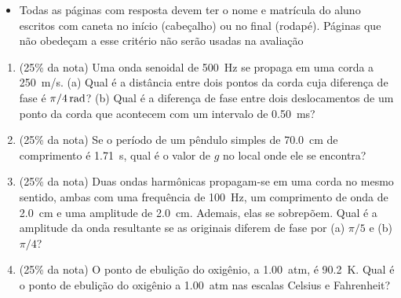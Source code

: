 \documentclass[12pt,a4paper,brazilian, fleqn]{article}
\newcommand{\ratio}[1]{(#1\% da nota)}
\begin{document}
\begin{tcolorbox}[colback=black!10, colframe=black!50, title=Observações]
    \begin{itemize}
        \item Todas as páginas com resposta devem ter o nome e matrícula do
            aluno escritos com caneta no início (cabeçalho) ou no final
            (rodapé). Páginas que não obedeçam a esse critério não serão usadas
            na avaliação
    \end{itemize}
\end{tcolorbox}

\vspace{2em}

\begin{enumerate}

    \item \ratio{25} Uma onda senoidal de \SI{500}{Hz} se propaga em uma corda
        a \SI{250}{m/s}. (a) Qual é a distância entre dois pontos da corda cuja
        diferença de fase é \(\SI[parse-numbers=false]{\pi/4}{rad}\)? (b) Qual
        é a diferença de fase entre dois deslocamentos de um ponto da corda que
        acontecem com um intervalo de \SI{0.50}{ms}?

    \item \ratio{25} Se o período de um pêndulo simples de \SI{70.0}{cm} de
        comprimento é \SI{1.71}{s}, qual é o valor de \(g\) no local onde ele
        se encontra?

    \item \ratio{25} Duas ondas harmônicas propagam-se em uma corda no mesmo
        sentido, ambas com uma frequência de \SI{100}{Hz}, um comprimento de
        onda de \SI{2.0}{cm} e uma amplitude de \SI{2.0}{cm}. Ademais, elas se
        sobrepõem. Qual é a amplitude da onda resultante se as originais
        diferem de fase por (a) \(\pi/5\) e (b) \(\pi/4\)?

    \item \ratio{25} O ponto de ebulição do oxigênio, a \SI{1.00}{atm}, é
        \SI{90.2}{K}. Qual é o ponto de ebulição do oxigênio a \SI{1.00}{atm}
        nas escalas Celsius e Fahrenheit?
\end{enumerate}
\end{document}
